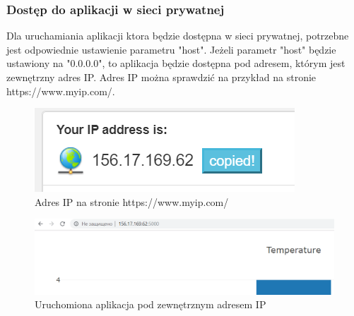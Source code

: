 \documentclass[a4paper]{article}
\begin{document}
    \subsubsection{Dostęp do aplikacji w sieci prywatnej}

        Dla uruchamiania aplikacji ktora będzie dostępna w sieci prywatnej, potrzebne jest odpowiednie ustawienie parametru "host". Jeżeli parametr "host" będzie ustawiony na "0.0.0.0", to aplikacja będzie dostępna pod adresem, którym jest zewnętrzny adres IP. Adres IP można sprawdzić na przykład na stronie https://www.myip.com/.
        
        \begin{figure}[H]
            \centering
            \includegraphics{images/myipaddress.png}
            \caption{Adres IP na stronie https://www.myip.com/}
        \end{figure}
        
        \begin{figure}[H]
            \centering
            \includegraphics[scale=0.7]{images/runningApp.png}
            \caption{Uruchomiona aplikacja pod zewnętrznym adresem IP}
        \end{figure}
        
\end{document}
